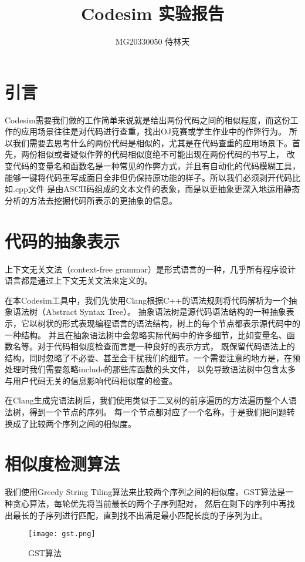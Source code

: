 \documentclass[UTF8]{article}
\begin{document}
\title{Codesim 实验报告}

\author{MG20330050 侍林天}

\maketitle

\section{引言}

Codesim需要我们做的工作简单来说就是给出两份代码之间的相似程度，而这份工作的应用场景往往是对代码进行查重，找出OJ竞赛或学生作业中的作弊行为。
所以我们需要去思考什么的两份代码是相似的，尤其是在代码查重的应用场景下。首先，两份相似或者疑似作弊的代码相似度绝不可能出现在两份代码的书写上，
改变代码的变量名和函数名是一种常见的作弊方式，并且有自动化的代码模糊工具，能够一键将代码重写成面目全非但仍保持原功能的样子。所以我们必须剥开代码比如.cpp文件
是由ASCII码组成的文本文件的表象，而是以更抽象更深入地运用静态分析的方法去挖掘代码所表示的更抽象的信息。

\section{代码的抽象表示}

上下文无关文法（context-free grammar）是形式语言的一种，几乎所有程序设计语言都是通过上下文无关文法来定义的。

在本Codesim工具中，我们先使用Clang根据C++的语法规则将代码解析为一个抽象语法树（Abstract Syntax Tree）。
抽象语法树是源代码语法结构的一种抽象表示，它以树状的形式表现编程语言的语法结构，树上的每个节点都表示源代码中的一种结构。
并且在抽象语法树中会忽略实际代码中的许多细节，比如变量名、函数名等。对于代码相似度检查而言是一种良好的表示方式，
既保留代码语法上的结构，同时忽略了不必要、甚至会干扰我们的细节。一个需要注意的地方是，在预处理时我们需要忽略include的那些库函数的头文件，
以免导致语法树中包含太多与用户代码无关的信息影响代码相似度的检查。

在Clang生成完语法树后，我们使用类似于二叉树的前序遍历的方法遍历整个人语法树，得到一个节点的序列。
每一个节点都对应了一个名称，于是我们把问题转换成了比较两个序列之间的相似度。

\section{相似度检测算法}
我们使用Greedy String Tiling算法来比较两个序列之间的相似度。GST算法是一种贪心算法，每轮优先将当前最长的两个子序列配对，
然后在剩下的序列中再找出最长的子序列进行匹配，直到找不出满足最小匹配长度的子序列为止。
\begin{figure}[h]
    \centering
    \texttt{[image: gst.png]}
    \caption{GST算法}
\end{figure}
\end{document}
